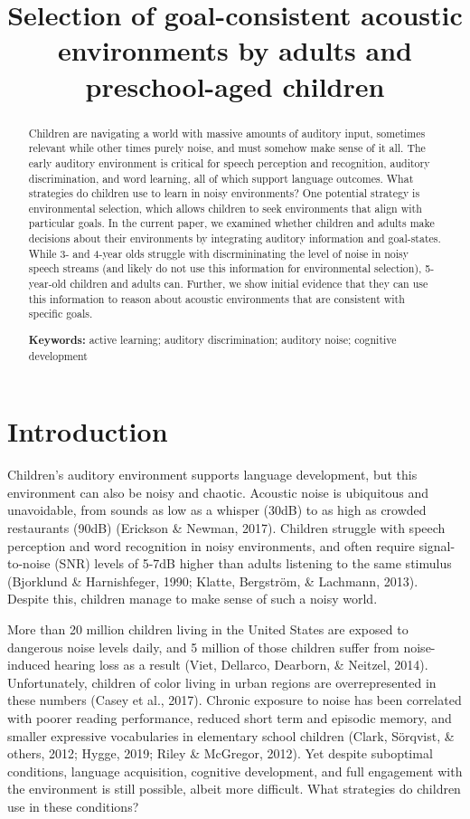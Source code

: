 \documentclass[10pt, letterpaper]{article}
\title{Selection of goal-consistent acoustic environments by adults and
preschool-aged children}
\begin{document}
\maketitle

\begin{abstract}
Children are navigating a world with massive amounts of auditory input,
sometimes relevant while other times purely noise, and must somehow make
sense of it all. The early auditory environment is critical for speech
perception and recognition, auditory discrimination, and word learning,
all of which support language outcomes. What strategies do children use
to learn in noisy environments? One potential strategy is environmental
selection, which allows children to seek environments that align with
particular goals. In the current paper, we examined whether children and
adults make decisions about their environments by integrating auditory
information and goal-states. While 3- and 4-year olds struggle with
discrmininating the level of noise in noisy speech streams (and likely
do not use this information for environmental selection), 5-year-old
children and adults can. Further, we show initial evidence that they can
use this information to reason about acoustic environments that are
consistent with specific goals.

\textbf{Keywords:}
active learning; auditory discrimination; auditory noise; cognitive
development
\end{abstract}

\hypertarget{introduction}{%
\section{Introduction}\label{introduction}}

Children's auditory environment supports language development, but this
environment can also be noisy and chaotic. Acoustic noise is ubiquitous
and unavoidable, from sounds as low as a whisper (30dB) to as high as
crowded restaurants (90dB) (Erickson \& Newman, 2017). Children struggle
with speech perception and word recognition in noisy environments, and
often require signal-to-noise (SNR) levels of 5-7dB higher than adults
listening to the same stimulus (Bjorklund \& Harnishfeger, 1990; Klatte,
Bergström, \& Lachmann, 2013). Despite this, children manage to make
sense of such a noisy world.

More than 20 million children living in the United States are exposed to
dangerous noise levels daily, and 5 million of those children suffer
from noise-induced hearing loss as a result (Viet, Dellarco, Dearborn,
\& Neitzel, 2014). Unfortunately, children of color living in urban
regions are overrepresented in these numbers (Casey et al., 2017).
Chronic exposure to noise has been correlated with poorer reading
performance, reduced short term and episodic memory, and smaller
expressive vocabularies in elementary school children (Clark, Sörqvist,
\& others, 2012; Hygge, 2019; Riley \& McGregor, 2012). Yet despite
suboptimal conditions, language acquisition, cognitive development, and
full engagement with the environment is still possible, albeit more
difficult. What strategies do children use in these conditions?
\end{document}
